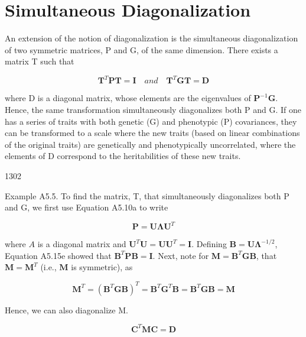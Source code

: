 \documentclass{article}
\begin{document}
\section{Simultaneous Diagonalization}
An extension of the notion of diagonalization is the simultaneous diagonalization of two symmetric matrices, P and G, of the same dimension. There exists a matrix T such that

\begin{equation}
\mathbf{T}^{T}\mathbf{P}\mathbf{T}=\mathbf{I}\quad and\quad\mathbf{T}^{T}\mathbf{G}\mathbf{T}=\mathbf{D}
\end{equation}

where D is a diagonal matrix, whose elements are the eigenvalues of  $ \mathbf{P}^{-1}\mathbf{G} $. Hence, the same transformation simultaneously diagonalizes both P and G. If one has a series of traits with both genetic (G) and phenotypic (P) covariances, they can be transformed to a scale where the new traits (based on linear combinations of the original traits) are genetically and phenotypically uncorrelated, where the elements of D correspond to the heritabilities of these new traits.

1302

Example A5.5. To find the matrix, T, that simultaneously diagonalizes both P and G, we first use Equation A5.10a to write

\begin{equation}
\mathbf{P}=\mathbf{U}\boldsymbol{\Lambda}\mathbf{U}^{T}
\end{equation}

where  $ A $ is a diagonal matrix and  $ \mathbf{U}^T\mathbf{U} = \mathbf{U}\mathbf{U}^T = \mathbf{I} $. Defining  $ \mathbf{B} = \mathbf{U}\boldsymbol{\Lambda}^{-1/2} $, Equation A5.15e showed that  $ \mathbf{B}^T\mathbf{P}\mathbf{B} = \mathbf{I} $. Next, note for  $ \mathbf{M} = \mathbf{B}^T\mathbf{G}\mathbf{B} $, that  $ \mathbf{M} = \mathbf{M}^T $ (i.e.,  $ \mathbf{M} $ is symmetric), as

\begin{equation}
\mathbf{M}^{T}=\left(\mathbf{B}^{T}\mathbf{G}\mathbf{B}\right)^{T}=\mathbf{B}^{T}\mathbf{G}^{T}\mathbf{B}=\mathbf{B}^{T}\mathbf{G}\mathbf{B}=\mathbf{M}
\end{equation}

Hence, we can also diagonalize M.

\begin{equation}
\mathbf{C}^{T}\mathbf{M}\mathbf{C}=\mathbf{D}
\end{equation}
\end{document}
